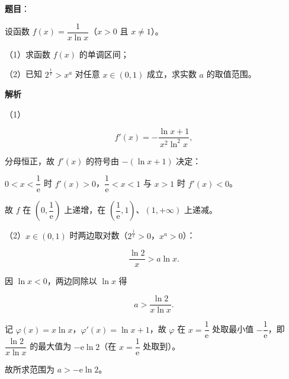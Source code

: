 \begin{answer}

\textbf{题目}：

设函数 $f(x)=\dfrac1{x\ln x}$（$x>0$ 且 $x\neq1$）。

（1）求函数 $f(x)$ 的单调区间；

（2）已知 $2^{\frac1x}>x^a$ 对任意 $x\in(0,1)$ 成立，求实数 $a$ 的取值范围。

\textbf{解析}

（1）

\nopagebreak[4]
\[f'(x)=-\frac{\ln x+1}{x^2\ln^2x},\]

分母恒正，故 $f'(x)$ 的符号由 $-(\ln x+1)$ 决定：

$0<x<\dfrac1{\mathrm e}$ 时 $f'(x)>0$，$\dfrac1{\mathrm e}<x<1$ 与 $x>1$ 时 $f'(x)<0$。

故 $f$ 在 $\left(0,\dfrac1{\mathrm e}\right)$ 上递增，在 $\left(\dfrac1{\mathrm e},1\right)$、$(1,+\infty)$ 上递减。

（2）$x\in(0,1)$ 时两边取对数（$2^{\frac1x}>0$，$x^a>0$）：

\nopagebreak[4]
\[\frac{\ln2}x>a\ln x.\]

因 $\ln x<0$，两边同除以 $\ln x$ 得

\nopagebreak[4]
\[a>\frac{\ln2}{x\ln x}.\]

记 $\varphi(x)=x\ln x$，$\varphi'(x)=\ln x+1$，故 $\varphi$ 在 $x=\dfrac1{\mathrm e}$ 处取最小值 $-\dfrac1{\mathrm e}$，即 $\dfrac{\ln2}{x\ln x}$ 的最大值为 $-\mathrm e\ln2$（在 $x=\dfrac1{\mathrm e}$ 处取到）。

故所求范围为 $a>-\mathrm e\ln2$。


\end{answer}
